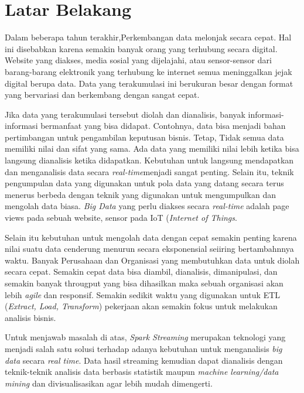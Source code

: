 \documentclass[a4paper,twoside]{article}
\begin{document}
\section{Latar Belakang}
Dalam beberapa tahun terakhir,Perkembangan data melonjak secara cepat. Hal ini disebabkan karena semakin banyak orang yang terhubung secara digital. Website yang diakses, media sosial yang dijelajahi, atau sensor-sensor dari barang-barang elektronik yang terhubung ke internet semua meninggalkan jejak digital berupa data. Data yang terakumulasi ini berukuran besar dengan format yang bervariasi dan berkembang dengan sangat cepat.

Jika data yang terakumulasi tersebut diolah dan dianalisis, banyak informasi-informasi bermanfaat yang bisa didapat. Contohnya, data bisa menjadi bahan pertimbangan untuk pengambilan keputusan bisnis. Tetap, Tidak semua data memiliki nilai dan sifat yang sama. Ada data yang memiliki nilai lebih ketika bisa langsung dianalisis ketika didapatkan. Kebutuhan untuk langsung mendapatkan dan menganalisis data secara \textit{real-time}menjadi sangat penting. Selain itu, teknik pengumpulan data yang digunakan untuk pola data yang datang secara terus menerus berbeda dengan teknik yang digunakan untuk mengumpulkan dan mengolah data biasa. \textit{Big Data} yang perlu diakses secara \textit{real-time} adalah page views pada sebuah website, sensor pada IoT (\textit{Internet of Things}.

Selain itu kebutuhan untuk mengolah data dengan cepat semakin penting karena nilai suatu data cenderung menurun secara eksponensial seiiring bertambahnnya waktu. Banyak Perusahaan dan Organisasi yang membutuhkan data untuk diolah secara cepat. Semakin cepat data bisa diambil, dianalisis, dimanipulasi, dan semakin banyak througput yang bisa dihasilkan maka sebuah organisasi akan lebih \textit{agile} dan responsif. Semakin sedikit waktu yang digunakan untuk ETL (\textit{Extract, Load, Transform}) pekerjaan akan semakin fokus untuk melakukan analisis bisnis.

Untuk menjawab masalah di atas, \textit{Spark Streaming} merupakan teknologi yang menjadi salah satu solusi terhadap adanya kebutuhan untuk menganalisis \textit{big data} secara \textit{real time}. Data hasil streaming kemudian dapat dianalisis dengan teknik-teknik analisis data berbasis statistik maupun \textit{machine learning/data mining} dan divisualisasikan agar lebih mudah dimengerti.\newpage
\end{document}
